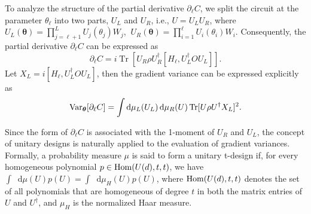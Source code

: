 \documentclass[%
 reprint,
 superscriptaddress,
 amsmath,amssymb,
 aps, prl, twocolumn, showpacs,
]{revtex4-2}
\newcommand*{\dif}{\mathop{}\!\mathrm{d}}
\begin{document}



To analyze the structure of the partial derivative $\partial_\ell C$, we split the circuit at the parameter $\theta_\ell$ into two parts, $U_L$ and $U_R$, i.e., $U = U_L U_R$, where $U_L(\boldsymbol\theta) = \prod_{j=\ell+1}^L U_j(\theta_j) W_j$, $\ U_R(\boldsymbol\theta) = \prod_{i=1}^\ell U_i(\theta_i) W_i$. Consequently, the partial derivative $\partial_\ell C$ can be expressed as
\begin{equation}
    \partial_\ell C = i\operatorname{Tr}[U_R\rho U_R^\dagger [H_\ell, U_L^\dagger O U_L]].
    \label{eq: var}
\end{equation}
Let $X_L = i[H_\ell, U_L^\dagger O U_L]$, then the gradient variance can be expressed explicitly as 
\begin{equation}
    {\rm Var}_{\boldsymbol\theta}[\partial_\ell C] =\int\dif\mu_L(U_L)\dif\mu_R(U)\operatorname{Tr}[U\rho U^\dagger X_L]^2.
    \label{eq:var2}
\end{equation}



Since the form of $\partial_\ell C$ is associated with the 1-moment of $U_R$ and $U_L$, the concept of unitary designs is naturally applied to the evaluation of gradient variances. Formally, a probability measure $\mu$ is said to form a unitary t-design\cite{gross2007evenly, dankert2009exact} if, for every homogeneous polynomial $p\in {\rm Hom}( U(d), t, t)$, we have $\int \dif \mu(U) p(U) = \int \dif\mu_H(U)p(U)$, where ${\rm Hom}( U(d), t, t)$ denotes the set of all polynomials that are homogeneous of degree $t$ in both the matrix entries of $U$ and $U^\dagger$, and $\mu_H$ is the normalized Haar measure. 
\end{document}
